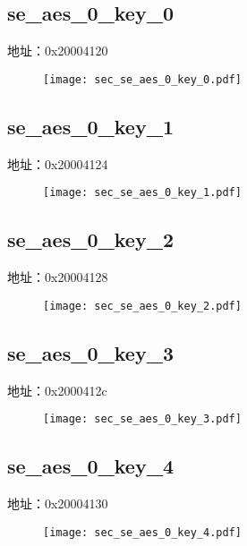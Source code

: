 \subsection{se\_aes\_0\_key\_0}
\label{sec-se-aes-0-key-0}
地址：0x20004120
 \begin{figure}[H]
\texttt{[image: sec\_se\_aes\_0\_key\_0.pdf]}
\end{figure}

\subsection{se\_aes\_0\_key\_1}
\label{sec-se-aes-0-key-1}
地址：0x20004124
 \begin{figure}[H]
\texttt{[image: sec\_se\_aes\_0\_key\_1.pdf]}
\end{figure}

\subsection{se\_aes\_0\_key\_2}
\label{sec-se-aes-0-key-2}
地址：0x20004128
 \begin{figure}[H]
\texttt{[image: sec\_se\_aes\_0\_key\_2.pdf]}
\end{figure}

\subsection{se\_aes\_0\_key\_3}
\label{sec-se-aes-0-key-3}
地址：0x2000412c
 \begin{figure}[H]
\texttt{[image: sec\_se\_aes\_0\_key\_3.pdf]}
\end{figure}

\subsection{se\_aes\_0\_key\_4}
\label{sec-se-aes-0-key-4}
地址：0x20004130
 \begin{figure}[H]
\texttt{[image: sec\_se\_aes\_0\_key\_4.pdf]}
\end{figure}

